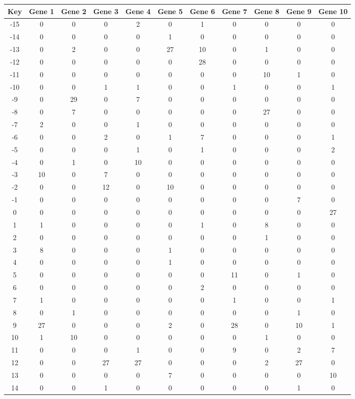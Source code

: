 \begin{tabular}{|c|c|c|c|c|c|c|c|c|c|c|}
\hline
Key & Gene 1 & Gene 2 & Gene 3 & Gene 4 & Gene 5 & Gene 6 & Gene 7 & Gene 8 & Gene 9 & Gene 10 \\
\hline
-15 & 0 & 0 & 0 & 2 & 0 & 1 & 0 & 0 & 0 & 0 \\
-14 & 0 & 0 & 0 & 0 & 1 & 0 & 0 & 0 & 0 & 0 \\
-13 & 0 & 2 & 0 & 0 & 27 & 10 & 0 & 1 & 0 & 0 \\
-12 & 0 & 0 & 0 & 0 & 0 & 28 & 0 & 0 & 0 & 0 \\
-11 & 0 & 0 & 0 & 0 & 0 & 0 & 0 & 10 & 1 & 0 \\
-10 & 0 & 0 & 1 & 1 & 0 & 0 & 1 & 0 & 0 & 1 \\
-9 & 0 & 29 & 0 & 7 & 0 & 0 & 0 & 0 & 0 & 0 \\
-8 & 0 & 7 & 0 & 0 & 0 & 0 & 0 & 27 & 0 & 0 \\
-7 & 2 & 0 & 0 & 1 & 0 & 0 & 0 & 0 & 0 & 0 \\
-6 & 0 & 0 & 2 & 0 & 1 & 7 & 0 & 0 & 0 & 1 \\
-5 & 0 & 0 & 0 & 1 & 0 & 1 & 0 & 0 & 0 & 2 \\
-4 & 0 & 1 & 0 & 10 & 0 & 0 & 0 & 0 & 0 & 0 \\
-3 & 10 & 0 & 7 & 0 & 0 & 0 & 0 & 0 & 0 & 0 \\
-2 & 0 & 0 & 12 & 0 & 10 & 0 & 0 & 0 & 0 & 0 \\
-1 & 0 & 0 & 0 & 0 & 0 & 0 & 0 & 0 & 7 & 0 \\
0 & 0 & 0 & 0 & 0 & 0 & 0 & 0 & 0 & 0 & 27 \\
1 & 1 & 0 & 0 & 0 & 0 & 1 & 0 & 8 & 0 & 0 \\
2 & 0 & 0 & 0 & 0 & 0 & 0 & 0 & 1 & 0 & 0 \\
3 & 8 & 0 & 0 & 0 & 1 & 0 & 0 & 0 & 0 & 0 \\
4 & 0 & 0 & 0 & 0 & 1 & 0 & 0 & 0 & 0 & 0 \\
5 & 0 & 0 & 0 & 0 & 0 & 0 & 11 & 0 & 1 & 0 \\
6 & 0 & 0 & 0 & 0 & 0 & 2 & 0 & 0 & 0 & 0 \\
7 & 1 & 0 & 0 & 0 & 0 & 0 & 1 & 0 & 0 & 1 \\
8 & 0 & 1 & 0 & 0 & 0 & 0 & 0 & 0 & 1 & 0 \\
9 & 27 & 0 & 0 & 0 & 2 & 0 & 28 & 0 & 10 & 1 \\
10 & 1 & 10 & 0 & 0 & 0 & 0 & 0 & 1 & 0 & 0 \\
11 & 0 & 0 & 0 & 1 & 0 & 0 & 9 & 0 & 2 & 7 \\
12 & 0 & 0 & 27 & 27 & 0 & 0 & 0 & 2 & 27 & 0 \\
13 & 0 & 0 & 0 & 0 & 7 & 0 & 0 & 0 & 0 & 10 \\
14 & 0 & 0 & 1 & 0 & 0 & 0 & 0 & 0 & 1 & 0 \\
\hline
\end{tabular}